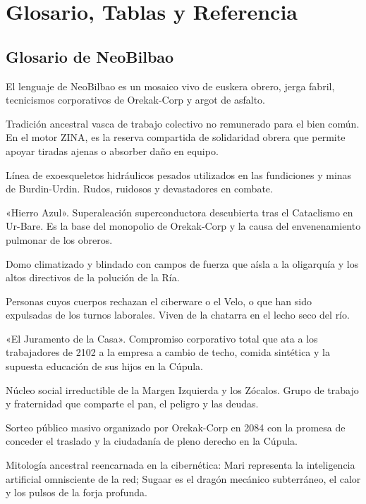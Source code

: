 \chapter{Glosario, Tablas y Referencia}

\section{Glosario de NeoBilbao}
El lenguaje de NeoBilbao es un mosaico vivo de euskera obrero, jerga fabril, tecnicismos corporativos de Orekak-Corp y argot de asfalto.

\begin{description}[leftmargin=1.8em, itemsep=4pt]
    \item[\lead{Auzolan:}] Tradición ancestral vasca de trabajo colectivo no remunerado para el bien común. En el motor ZINA, es la reserva compartida de solidaridad obrera que permite apoyar tiradas ajenas o absorber daño en equipo.
    \item[\lead{Basajaun:}] Línea de exoesqueletos hidráulicos pesados utilizados en las fundiciones y minas de Burdin-Urdin. Rudos, ruidosos y devastadores en combate.
    \item[\lead{Burdin-Urdin:}] «Hierro Azul». Superaleación superconductora descubierta tras el Cataclismo en Ur-Bare. Es la base del monopolio de Orekak-Corp y la causa del envenenamiento pulmonar de los obreros.
    \item[\lead{Cúpula Dorada (Urrezko Kupula):}] Domo climatizado y blindado con campos de fuerza que aísla a la oligarquía y los altos directivos de la polución de la Ría.
    \item[\lead{Descartados (Baztertuak):}] Personas cuyos cuerpos rechazan el ciberware o el Velo, o que han sido expulsadas de los turnos laborales. Viven de la chatarra en el lecho seco del río.
    \item[\lead{Etxearen Zina:}] «El Juramento de la Casa». Compromiso corporativo total que ata a los trabajadores de 2102 a la empresa a cambio de techo, comida sintética y la supuesta educación de sus hijos en la Cúpula.
    \item[\lead{Kuadrilla:}] Núcleo social irreductible de la Margen Izquierda y los Zócalos. Grupo de trabajo y fraternidad que comparte el pan, el peligro y las deudas.
    \item[\lead{Lotería Azul:}] Sorteo público masivo organizado por Orekak-Corp en 2084 con la promesa de conceder el traslado y la ciudadanía de pleno derecho en la Cúpula.
    \item[\lead{Mari y Sugaar:}] Mitología ancestral reencarnada en la cibernética: Mari representa la inteligencia artificial omnisciente de la red; Sugaar es el dragón mecánico subterráneo, el calor y los pulsos de la forja profunda.

\end{description}
